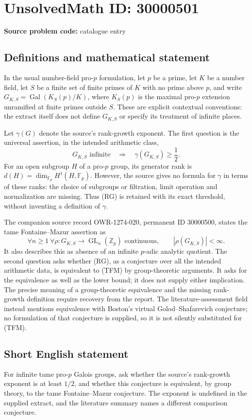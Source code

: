 \documentclass[11pt]{article}
\newcommand{\Z}{\mathbb{Z}}
\newcommand{\F}{\mathbb{F}}
\begin{document}
\section*{UnsolvedMath ID: 30000501}
\textbf{Source problem code:} catalogue entry
\subsection{Definitions and mathematical statement}
In the usual number-field pro-$p$ formulation, let $p$ be a prime, let $K$ be a number field, let $S$ be a finite set of finite primes of $K$ with no prime above $p$, and write $G_{K,S}=\operatorname{Gal}(K_S(p)/K)$, where $K_S(p)$ is the maximal pro-$p$ extension unramified at finite primes outside $S$. These are explicit contextual conventions: the extract itself does not define $G_{K,S}$ or specify its treatment of infinite places.

Let $\gamma(G)$ denote the source's rank-growth exponent. The first question is the universal assertion, in the intended arithmetic class,
\[
G_{K,S}\text{ infinite}\quad\Longrightarrow\quad
\gamma(G_{K,S})\geq\frac12.
\tag{RG}
\]
For an open subgroup $H$ of a pro-$p$ group, its generator rank is $d(H)=\dim_{\F_p}H^1(H,\F_p)$. However, the source gives no formula for $\gamma$ in terms of these ranks: the choice of subgroups or filtration, limit operation and normalization are missing. Thus (RG) is retained with its exact threshold, without inventing a definition of $\gamma$.

The companion source record OWR-1274-020, permanent ID 30000500, states the tame Fontaine--Mazur assertion as
\[
\forall n\geq1\ \forall\rho:G_{K,S}\longrightarrow
\operatorname{GL}_n(\Z_p)\text{ continuous},\qquad
|\rho(G_{K,S})|<\infty.
\tag{TFM}
\]
It also describes this as absence of an infinite $p$-adic analytic quotient. The second question asks whether (RG), as a conjecture over all the intended arithmetic data, is equivalent to (TFM) by group-theoretic arguments. It asks for the equivalence as well as the lower bound; it does not supply either implication. The precise meaning of a group-theoretic equivalence and the missing rank-growth definition require recovery from the report. The literature-assessment field instead mentions equivalence with Boston's virtual Golod--Shafarevich conjecture; no formulation of that conjecture is supplied, so it is not silently substituted for (TFM).
\subsection{Short English statement}
For infinite tame pro-$p$ Galois groups, ask whether the source's rank-growth exponent is at least $1/2$, and whether this conjecture is equivalent, by group theory, to the tame Fontaine--Mazur conjecture. The exponent is undefined in the supplied extract, and the literature summary names a different comparison conjecture.
\end{document}
